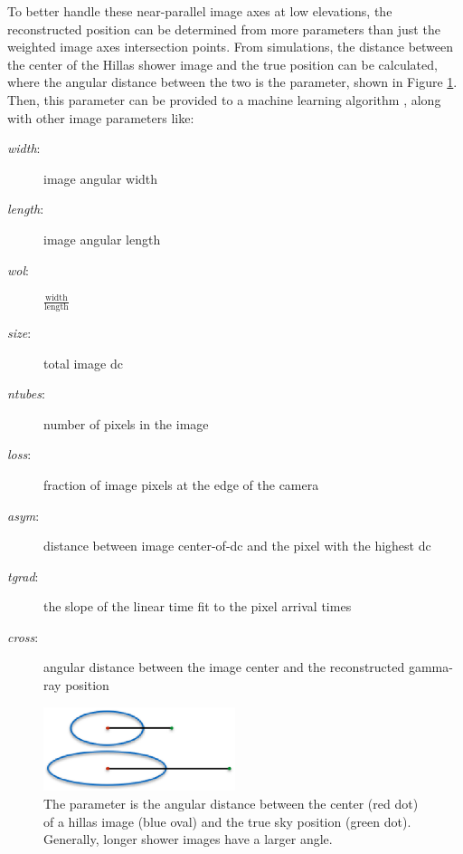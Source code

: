     To better handle these near-parallel image axes at low elevations, the reconstructed position can be determined from more parameters than just the weighted image axes intersection points.
    From simulations, the distance between the center of the Hillas shower image and the true position can be calculated, where the angular distance between the two is the \disp{} parameter\cite{Senturk:2011}, shown in Figure \ref{fig:dispdiagram}.
    Then, this \disp{} parameter can be provided to a machine learning algorithm \cite{Beilicke2012NIM}, along with other image parameters like:
    \begin{description}
      \item[\textit{width}:] image angular width
      \item[\textit{length}:] image angular length
      \item[\textit{wol}:] $\frac{\textrm{width}}{\textrm{length}}$
      \item[\textit{size}:] total image dc
      \item[\textit{ntubes}:] number of pixels in the image
      \item[\textit{loss}:] fraction of image pixels at the edge of the camera
      \item[\textit{asym}:] distance between image center-of-dc and the pixel with the highest dc
      \item[\textit{tgrad}:] the slope of the linear time fit to the pixel arrival times
      \item[\textit{cross}:] angular distance between the image center and the reconstructed gamma-ray position
    \end{description}


    \begin{figure}[ht]
      \begin{center}
        \includegraphics[width=0.5\textwidth]{images/disp_parameter_cropped.eps}
        \caption[Angular Reconstruction Disp]{The \disp{} parameter is the angular distance between the center (red dot) of a hillas image (blue oval) and the true sky position (green dot).  Generally, longer shower images have a larger \disp{} angle.}\label{fig:dispdiagram}
      \end{center}
    \end{figure}

